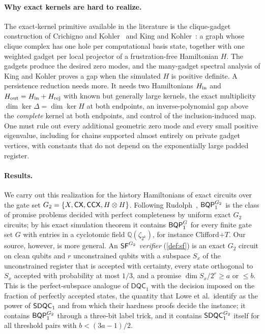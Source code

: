 \paragraph{Why exact kernels are hard to realize.}
The exact-kernel primitive available in the literature is the clique-gadget construction of Crichigno and Kohler~\cite{crichigno2024clique} and King and Kohler~\cite{king2026gapped}: a graph whose clique complex has one hole per computational basis state, together with one weighted gadget per local projector of a frustration-free Hamiltonian \(H\). The gadgets produce the desired zero modes, and the many-gadget spectral analysis of King and Kohler proves a gap when the simulated \(H\) is positive definite. A persistence reduction needs more. It needs two Hamiltonians \(H_{\rm in}\) and \(H_{\rm out}=H_{\rm in}+H_{\rm rej}\) with known but generally large kernels, the exact multiplicity \(\dim\ker\Delta=\dim\ker H\) at both endpoints, an inverse-polynomial gap above the \emph{complete} kernel at both endpoints, and control of the inclusion-induced map. One must rule out every additional geometric zero mode and every small positive eigenvalue, including for chains supported almost entirely on private gadget vertices, with constants that do not depend on the exponentially large padded register.

\paragraph{Results.}
We carry out this realization for the history Hamiltonians of exact circuits over the gate set \(G_2=\{X,\mathsf{CX},\mathsf{CCX},H\otimes H\}\). Following Rudolph~\cite{rudolph2026universal}, \(\mathsf{BQP}_{1}^{G_2}\) is the class of promise problems decided with perfect completeness by uniform exact \(G_2\) circuits; by his exact simulation theorem it contains \(\mathsf{BQP}_{1}^{G}\) for every finite gate set \(G\) with entries in a cyclotomic field \(\mathbb Q(\zeta_{2^k})\), for instance Clifford\(+T\). Our source, however, is more general. An \emph{\(\mathsf{SF}^{G_2}\) verifier} (\cref{def:sf}) is an exact \(G_2\) circuit on clean qubits and \(r\) unconstrained qubits with a subspace \(S_x\) of the unconstrained register that is accepted with certainty, every state orthogonal to \(S_x\) accepted with probability at most \(1/3\), and a promise \(\dim S_x/2^{r}\ge a\) or \(\le b\). This is the perfect-subspace analogue of \(\mathsf{DQC}_1\) with the decision imposed on the fraction of perfectly accepted states, the quantity that Lowe et al.\ identify as the power of \(\mathsf{SDQC}_{1}\) and from which their hardness proofs decide the instance; it contains \(\mathsf{BQP}_{1}^{G_2}\) through a three-bit label trick, and it contains \(\mathsf{SDQC}_{1}^{G_2}\) itself for all threshold pairs with \(b<(3a-1)/2\).

